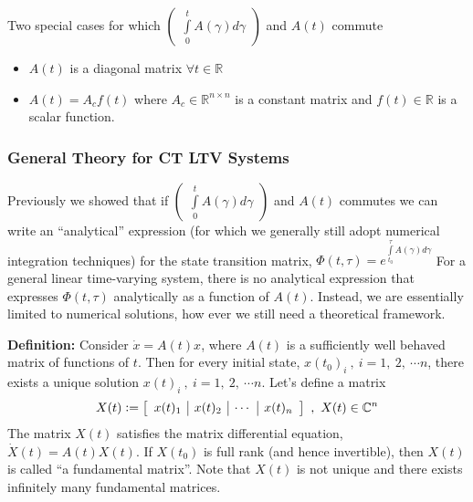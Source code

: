 \documentclass[twoside]{article}
\begin{document}
Two special cases for which $\begin{pmatrix} \int\limits_{0}^{t} A(\gamma) d\gamma \end{pmatrix}$ and $A(t)$ commute
%
\begin{itemize}
	\item $A(t)$ is a diagonal matrix $\forall t \in \mathbb{R}$
	\item $A(t) = A_c f(t)$ where $A_c \in \mathbb{R}^{n \times n}$ is a constant matrix and $f(t) \in \mathbb{R}$ is a scalar function.
\end{itemize}

\subsubsection{General Theory for CT LTV Systems}

Previously we showed that if $\begin{pmatrix} \int\limits_{0}^{t} A(\gamma) d\gamma \end{pmatrix}$ and $A(t)$ commutes we can write an ``analytical'' expression (for which we generally still adopt numerical integration techniques) for the state transition matrix, $\Phi(t,\tau) = e^{ \int\limits_{t_0}^{\tau} A(\gamma) d\gamma }$
For a general linear time-varying system, there is no analytical expression that expresses $\Phi(t,\tau)$ analytically as a function of $A(t)$. Instead, we are essentially limited to numerical solutions, how ever we still need a theoretical framework. 

\textbf{Definition:} Consider $\dot{x} = A(t) x$, where $A(t)$ is a sufficiently well behaved matrix of functions of $t$. Then for every initial state, 
$x(t_0)_i \ , \ i = 1, \ 2, \ \cdots n $, there exists a unique solution $x(t)_i \ , \ i = 1, \ 2, \ \cdots n $. Let's define a matrix 
%
\begin{align*}
X(t) \vcentcolon= \left[ \begin{array}{c|c|c|c} x(t)_1 & x(t)_2 & \cdots & x(t)_n \end{array} \right] \ , \ X(t) \in \mathbb{C}^{n}
\end{align*}
%
The matrix $X(t)$ satisfies the matrix differential equation, $\dot{X}(t) = A(t) X(t)$. If $X(t_0)$ is full rank (and hence invertible), then $X(t)$ is called ``a fundamental matrix''. Note that $X(t)$ is not unique and there exists infinitely many fundamental matrices. 

\vspace{6pt}
\end{document}
